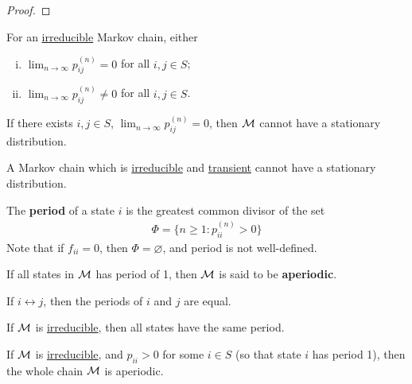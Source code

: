 \documentclass{article}
\newcommand{\upn}[0]{^{(n)}}
\begin{document}
	\begin{proof}
		
	\end{proof}
	
	\begin{corollary}
		For an \ul{irreducible} Markov chain, either
		\begin{enumerate}[(i)]
			\item $\lim _{n \rightarrow \infty} p_{i j}^{(n)}=0$ for all $i, j \in S$;
			\item $\lim _{n \rightarrow \infty} p_{i j}^{(n)}\neq 0$ for all $i, j \in S$.
		\end{enumerate}
	\end{corollary}
	
	\begin{corollary}
		If there exists $i, j \in S$, $\lim_{n \to \infty} p_{ij}\upn = 0$, then $\mathcal{{M}}$ cannot have a stationary distribution.
	\end{corollary}
	
	\begin{corollary}
		A Markov chain which is \ul{irreducible} and \ul{transient} cannot have a stationary distribution.
	\end{corollary}
	
	\begin{definition}
		The \textbf{period} of a state $i$ is the greatest common divisor of the set
		\begin{align}
			\Phi = \{n \geq 1: p_{ii}\upn > 0\}
		\end{align}
		Note that if $f_{ii} = 0$, then $\Phi = \varnothing$, and period is not well-defined.
	\end{definition}
	
	\begin{definition}
		If all states in $\mathcal{{M}}$ has period of 1, then $\mathcal{{M}}$ is said to be \textbf{aperiodic}.
	\end{definition}
	
	\begin{lemma}
		If $i \leftrightarrow j$, then the periods of $i$ and $j$ are equal.
	\end{lemma}
	
	\begin{corollary}
		If $\mathcal{{M}}$ is \ul{irreducible}, then all states have the same period.
	\end{corollary}
	
	\begin{corollary}
		If $\mathcal{{M}}$ is \ul{irreducible}, and $p_{ii} > 0$ for some $i \in S$ (so that state $i$ has period 1), then the whole chain $\mathcal{{M}}$ is aperiodic.
	\end{corollary}
	
\end{document}
